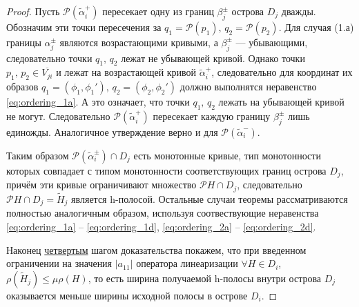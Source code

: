 \documentclass{article}
\begin{document}
\begin{proof}
Пусть $\mathcal{P} (\widetilde{\alpha}_i^+)$ пересекает одну из границ $\beta_j^{\pm}$ острова $D_j$ дважды.
Обозначим эти точки пересечения за $q_1 = \mathcal{P}(p_1), \, q_2 = \mathcal{P}(p_2)$.
Для случая (1.а) границы $\alpha_j^{\pm}$ являются возрастающими кривыми, а $\beta_j^{\pm}$ --- убывающими, следовательно точки $q_1, \, q_2$ лежат не убывающей кривой.
Однако точки $p_1, \, p_2 \in \overline{V_{ji}}$ и лежат на возрастающей кривой $\widetilde{\alpha}_i^+$, следовательно для координат их образов $q_1 = (\phi_1, \phi_1'), \, q_2 = (\phi_2, \phi_2')$ должно выполнятся неравенство \eqref{eq:ordering_1a}.
А это означает, что точки $q_1, \, q_2$ лежать на убывающей кривой не могут.
Следовательно $\mathcal{P} (\widetilde{\alpha}_i^+)$ пересекает каждую границу $\beta_j^{\pm}$ лишь единожды.
Аналогичное утверждение верно и для $\mathcal{P} (\widetilde{\alpha}_i^-)$.

Таким образом $\mathcal{P} (\widetilde{\alpha}_i^{\pm}) \cap D_j$ есть монотонные кривые, тип монотонности которых совпадает с типом монотонности соответствующих границ острова $D_j$, причём эти кривые ограничивают множество $\mathcal{P} H \cap D_j$, следовательно $\mathcal{P} H \cap D_j = \widetilde{H}_j$ является h-полосой.
Остальные случаи теоремы рассматриваются полностью аналогичным образом, используя соотвествующие неравенства \eqref{eq:ordering_1a} -- \eqref{eq:ordering_1d}, \eqref{eq:ordering_2a} -- \eqref{eq:ordering_2d}.

Наконец \underline{четвертым} шагом доказательства покажем, что при введенном ограничении на значения $|a_{11}|$ оператора линеаризации $\forall H \in D_i$, $\rho (\widetilde{H}_j) \le \mu \rho(H)$, то есть ширина получаемой h-полосы внутри острова $D_j$ оказывается меньше ширины исходной полосы в острове $D_i$.


\end{proof}
\end{document}
